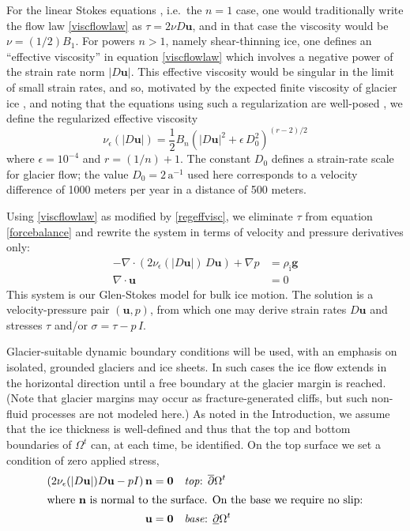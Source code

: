 \documentclass[letterpaper,final,12pt,reqno]{amsart}
\newcommand{\eps}{\epsilon}
\newcommand{\Div}{\nabla\cdot}
\newcommand{\bn}{\mathbf{n}}
\newcommand{\bu}{\mathbf{u}}
\newcommand{\bzero}{\bm{0}}
\newcommand{\rhoi}{\rho_{\text{i}}}
\begin{document}
For the linear Stokes equations \cite{Elmanetal2014}, i.e.~the $n=1$ case, one would traditionally write the flow law \eqref{viscflowlaw} as $\tau = 2\nu D\bu$, and in that case the viscosity would be $\nu = (1/2) B_1$.  For powers $n>1$, namely shear-thinning ice, one defines an ``effective viscosity'' in equation \eqref{viscflowlaw} which involves a negative power of the strain rate norm $|D\bu|$.  This effective viscosity would be singular in the limit of small strain rates, and so, motivated by the expected finite viscosity of glacier ice \cite{GreveBlatter2009}, and noting that the equations using such a regularization are well-posed \cite{JouvetRappaz2011}, we define the regularized effective viscosity
\begin{equation}
\nu_\eps(|D\bu|) = \frac{1}{2} B_n \left(|D\bu|^2 + \eps\, D_0^2\right)^{(r-2)/2} \label{regeffvisc}
\end{equation}
where $\eps = 10^{-4}$ and $r=(1/n)+1$.  The constant $D_0$ defines a strain-rate scale for glacier flow; the value $D_0 = 2 \,\text{a}^{-1}$ used here corresponds to a velocity difference of 1000 meters per year in a distance of 500 meters.

Using \eqref{viscflowlaw} as modified by \eqref{regeffvisc}, we eliminate $\tau$ from equation \eqref{forcebalance} and rewrite the system in terms of velocity and pressure derivatives only:
\begin{align}
- \nabla \cdot \left(2 \nu_\eps(|D\bu|)\, D\bu\right) + \nabla p &= \rhoi \mathbf{g} \label{stokes} \\
\Div \bu &= 0 \label{incompagain}
\end{align}
This system is our Glen-Stokes model for bulk ice motion.  The solution is a velocity-pressure pair $(\bu,p)$, from which one may derive strain rates $D\bu$ and stresses $\tau$ and/or $\sigma = \tau - p\,I$.

Glacier-suitable dynamic boundary conditions will be used, with an emphasis on isolated, grounded glaciers and ice sheets.  In such cases the ice flow extends in the horizontal direction until a free boundary at the glacier margin is reached.  (Note that glacier margins may occur as fracture-generated cliffs, but such non-fluid processes are not modeled here.)  As noted in the Introduction, we assume that the ice thickness is well-defined and thus that the top and bottom boundaries of $\Omega^t$ can, at each time, be identified.  On the top surface we set a condition of zero applied stress,
\begin{align}
\left(2 \nu_\eps(|D\bu|) D\bu - pI\right) \bn &= \bzero  &&\text{\emph{top}: } \overline{\partial} \Omega^t \label{topbc} \\
\intertext{where $\bn$ is normal to the surface.  On the base we require no slip:}
\bu &= \bzero  &&\text{\emph{base}: } \underline{\partial} \Omega^t \label{basebc}
\end{align}
\end{document}
